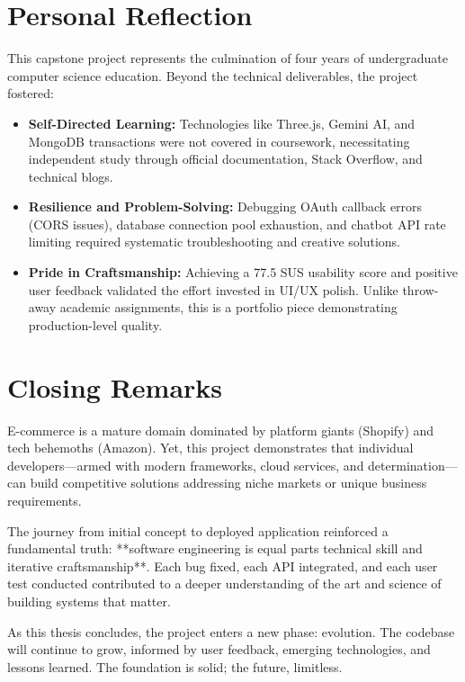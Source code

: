 \section{Personal Reflection}

This capstone project represents the culmination of four years of undergraduate computer science education. Beyond the technical deliverables, the project fostered:

\begin{itemize}
    \item \textbf{Self-Directed Learning:} Technologies like Three.js, Gemini AI, and MongoDB transactions were not covered in coursework, necessitating independent study through official documentation, Stack Overflow, and technical blogs.
    
    \item \textbf{Resilience and Problem-Solving:} Debugging OAuth callback errors (CORS issues), database connection pool exhaustion, and chatbot API rate limiting required systematic troubleshooting and creative solutions.
    
    \item \textbf{Pride in Craftsmanship:} Achieving a 77.5 SUS usability score and positive user feedback validated the effort invested in UI/UX polish. Unlike throw-away academic assignments, this is a portfolio piece demonstrating production-level quality.
\end{itemize}

\section{Closing Remarks}

E-commerce is a mature domain dominated by platform giants (Shopify) and tech behemoths (Amazon). Yet, this project demonstrates that individual developers—armed with modern frameworks, cloud services, and determination—can build competitive solutions addressing niche markets or unique business requirements.

The journey from initial concept to deployed application reinforced a fundamental truth: **software engineering is equal parts technical skill and iterative craftsmanship**. Each bug fixed, each API integrated, and each user test conducted contributed to a deeper understanding of the art and science of building systems that matter.

As this thesis concludes, the project enters a new phase: evolution. The codebase will continue to grow, informed by user feedback, emerging technologies, and lessons learned. The foundation is solid; the future, limitless.

